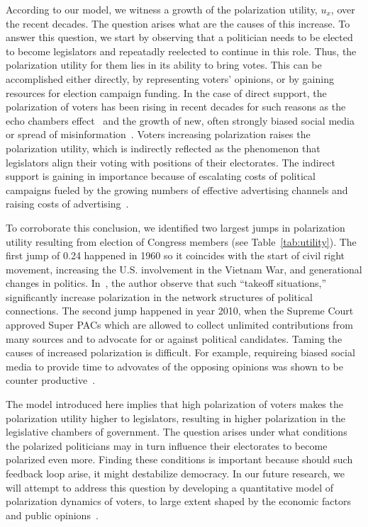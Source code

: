 According to our model, we witness a growth of the polarization utility, $u_x$, over the recent decades. 
The question arises what are the causes of this increase. To answer this question, we start by observing that a politician needs to be elected to become legislators and repeatadly reelected to continue in this role. Thus, the polarization utility for them lies in its ability to bring votes. This can be accomplished either directly, by representing voters' opinions, or by gaining resources for election campaign funding. In the case of direct support, the polarization of voters has been rising in recent decades for such reasons as the echo chambers effect~\cite{garrett2009echo, madsen2018large} and the growth of new, often strongly biased social media~\cite{garimella2018polarization} or spread of misinformation~\cite{jin2014misinformation, allcott2017social}. Voters increasing polarization raises the polarization utility, which is indirectly reflected as the phenomenon that legislators align their voting with positions of their electorates. The indirect support is gaining in importance because of escalating costs of political campaigns fueled by the growing numbers of effective advertising channels and raising costs of advertising~\cite{ansolabehere2001corruption}. 

To corroborate this conclusion, we identified two largest jumps in polarization utility resulting from election of Congress members (see 
Table~\ref{tab:utility}). The first jump of 0.24 happened in 1960 so it coincides with the start of civil right movement, increasing the U.S. involvement in the Vietnam War, and generational changes in politics. In~\cite{baldassarri2007dynamics}, the author observe that such ``takeoff situations,'' significantly increase polarization in the network structures of political connections. The second jump happened in year 2010, when the Supreme Court approved Super PACs which are allowed to collect unlimited contributions from many sources and to advocate for or against political candidates. 
Taming the causes of increased polarization is difficult. For example, requireing biased social media to provide time to advovates of the opposing opinions 
was shown to be counter productive~\cite{bail2018exposure}.

The model introduced here implies that high polarization of voters makes the polarization utility higher to legislators, resulting in higher polarization in the legislative chambers of government. The question arises under what conditions the polarized politicians may in turn influence their electorates to become polarized even more. Finding these conditions is important because should such feedback loop arise, it might destabilize democracy. In our future research, we will 
attempt to address this question by developing a quantitative model of polarization dynamics of voters, to large extent shaped by the economic factors and public opinions~\cite{baldassarri2008partisans}.

